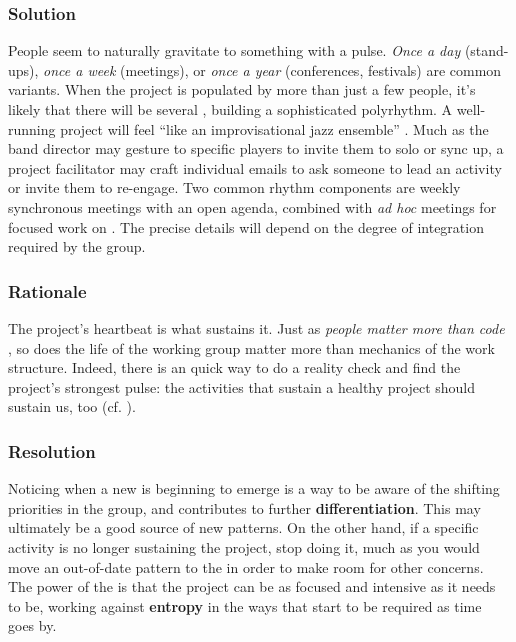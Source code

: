 \subsubsection*{Solution} People seem to naturally gravitate to something with a pulse.  \emph{Once a day} (stand-ups), \emph{once a week} (meetings), or \emph{once a year} (conferences, festivals) are common variants.  When the project is populated by more than just a few people, it's likely that there will be several , building a sophisticated polyrhythm.  A well-running project will feel ``like an improvisational jazz ensemble'' \cite{david2001software}.  Much as the band director may gesture to specific players to invite them to solo or sync up, a project facilitator may craft individual emails to ask someone to lead an activity or invite them to re-engage.  Two common rhythm components are weekly synchronous meetings with an open agenda, combined with \emph{ad hoc} meetings for focused work on .  The precise details will depend on the degree of integration required by the group.

\subsubsection*{Rationale}  The project's heartbeat is what sustains it. Just as \emph{people matter more than code} \cite{torvalds-interview}, so does the life of the working group matter more than mechanics of the work structure.  Indeed, there is an quick way to do a reality check and find the project's strongest pulse: the activities that sustain a healthy project should sustain us, too (cf. ).

\subsubsection*{Resolution} Noticing when a new  is beginning to emerge is a way to be aware of the shifting priorities in the group, and contributes to further \textbf{differentiation}.  This may ultimately be a good source of new patterns. On the other hand, if a specific activity is no longer sustaining the project, stop doing it, much as you would move an out-of-date pattern to the  in order to make room for other concerns. The power of the  is that the project can be as focused and intensive as it needs to be, working against \textbf{entropy} in the ways that start to be required as time goes by.

